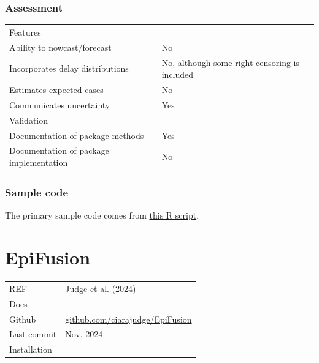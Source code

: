 \documentclass[
  letterpaper,
  DIV=11,
  numbers=noendperiod]{scrreprt}
\begin{document}
\subsection*{Assessment}\label{assessment-3}

\begin{longtable}[]{@{}
  >{\raggedright\arraybackslash}p{}
  >{\raggedright\arraybackslash}p{}@{}}
\toprule\noalign{}
\endhead
\bottomrule\noalign{}
\endlastfoot
Features & \\
Ability to nowcast/forecast & No \\
Incorporates delay distributions & No, although some right-censoring is
included \\
Estimates expected cases & No \\
Communicates uncertainty & Yes \\
Validation & \\
Documentation of package methods & Yes \\
Documentation of package implementation & No \\
\end{longtable}

\subsection*{Sample code}\label{sample-code-3}

The primary sample code comes from
\href{https://github.com/kpzoo/EpiFilter/blob/master/R\%20files/vignette.R}{this
R script}.

\chapter*{EpiFusion}\label{epifusion}


\begin{longtable}[]{@{}
  >{\raggedright\arraybackslash}p{}
  >{\raggedright\arraybackslash}p{}@{}}
\toprule\noalign{}
\endhead
\bottomrule\noalign{}
\endlastfoot
REF & Judge et al. (2024) \\
Docs & \\
Github &
\href{https://github.com/ciarajudge/EpiFusion}{github.com/ciarajudge/EpiFusion} \\
Last commit & Nov, 2024 \\
Installation & \\
\end{longtable}
\end{document}
